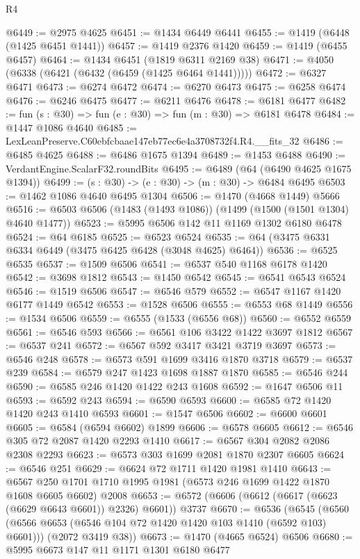 \begin{lexlean}{R4}
\begin{coremodule}
@6449 := @2975 @4625
@6451 := @1434 @6449 @6441
@6455 := @1419 (@6448 (@1425 @6451 @1441))
@6457 := @1419 @2376 @1420
@6459 := @1419 (@6455 @6457)
@6464 := @1434 @6451 (@1819 @6311 @2169 @38)
@6471 := @4050 (@6338 (@6421 (@6432 (@6459 (@1425 @6464 @1441)))))
@6472 := @6327 @6471
@6473 := @6274 @6472
@6474 := @6270 @6473
@6475 := @6258 @6474
@6476 := @6246 @6475
@6477 := @6211 @6476
@6478 := @6181 @6477
@6482 := fun (s : @30) => fun (e : @30) => fun (m : @30) => @6181 @6478
@6484 := @1447 @1086 @4640
@6485 := LexLeanPreserve.C60ebfcbaae147eb77ec6e4a3708732f4.R4.__fits_32
@6486 := @6485 @4625
@6488 := @6486 @1675 @1394
@6489 := @1453 @6488
@6490 := VerdantEngine.ScalarF32.roundBits
@6495 := @6489 (@64 (@6490 @4625 @1675 @1394))
@6499 := (s : @30) -> (e : @30) -> (m : @30) -> @6484 @6495
@6503 := @1462 @1086 @4640 @6495 @1304
@6506 := @1470 (@4668 @1449) @5666
@6516 := @6503 @6506 (@1483 (@1493 @1086)) (@1499 (@1500 (@1501 @1304) @4640 @1477))
@6523 := @5995 @6506 @142 @11 @1169 @1302 @6180 @6478
@6524 := @64 @6185
@6525 := @6523 @6524
@6535 := @64 (@3475 @6331 @6334 @6449 (@3475 @6425 @6428 (@3048 @4625) @6464))
@6536 := @6525 @6535
@6537 := @1509 @6506
@6541 := @6537 @540 @1168 @6178 @1420
@6542 := @3698 @1812
@6543 := @1450 @6542
@6545 := @6541 @6543 @6524
@6546 := @1519 @6506
@6547 := @6546 @579
@6552 := @6547 @1167 @1420 @6177 @1449 @6542
@6553 := @1528 @6506
@6555 := @6553 @68 @1449
@6556 := @1534 @6506
@6559 := @6555 (@1533 (@6556 @68))
@6560 := @6552 @6559
@6561 := @6546 @593
@6566 := @6561 @106 @3422 @1422 @3697 @1812
@6567 := @6537 @241
@6572 := @6567 @592 @3417 @3421 @3719 @3697
@6573 := @6546 @248
@6578 := @6573 @591 @1699 @3416 @1870 @3718
@6579 := @6537 @239
@6584 := @6579 @247 @1423 @1698 @1887 @1870
@6585 := @6546 @244
@6590 := @6585 @246 @1420 @1422 @243 @1608
@6592 := @1647 @6506 @11
@6593 := @6592 @243
@6594 := @6590 @6593
@6600 := @6585 @72 @1420 @1420 @243 @1410 @6593
@6601 := @1547 @6506
@6602 := @6600 @6601
@6605 := @6584 (@6594 @6602) @1899
@6606 := @6578 @6605
@6612 := @6546 @305 @72 @2087 @1420 @2293 @1410
@6617 := @6567 @304 @2082 @2086 @2308 @2293
@6623 := @6573 @303 @1699 @2081 @1870 @2307 @6605
@6624 := @6546 @251
@6629 := @6624 @72 @1711 @1420 @1981 @1410
@6643 := @6567 @250 @1701 @1710 @1995 @1981 (@6573 @246 @1699 @1422 @1870 @1608 @6605 @6602) @2008
@6653 := @6572 (@6606 (@6612 (@6617 (@6623 (@6629 @6643 @6601)) @2326) @6601)) @3737
@6670 := @6536
    (@6545
      (@6560 (@6566 @6653 (@6546 @104 @72 @1420 @1420 @103 @1410 (@6592 @103) @6601)))
      (@2072 @3419 @38))
@6673 := @1470 (@4665 @6524) @6506
@6680 := @5995 @6673 @147 @11 @1171 @1301 @6180 @6477

\end{coremodule}
\end{lexlean}

